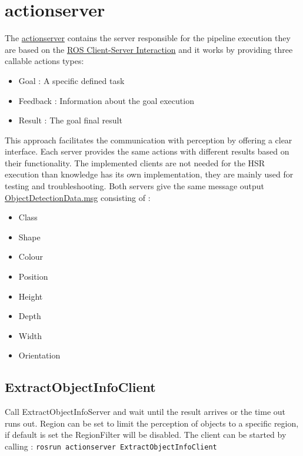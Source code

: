 \documentclass[main.tex]{subfiles}
\begin{document}
		\section{actionserver}
The \href{https://github.com/SUTURO/suturo_perception/tree/master/actionserver}{actionserver} contains the server responsible for the pipeline execution they are based on the \href{http://wiki.ros.org/actionlib}{ROS Client-Server Interaction} and it works by providing three callable actions types:
\begin{itemize}
	\item Goal : A specific defined task 
	\item Feedback : Information about the goal execution  
	\item Result : The goal final result 
\end{itemize}
This approach facilitates the communication with perception by offering a clear interface.
Each server provides the same actions with different results based on their functionality.
The implemented clients are not needed for the HSR execution than knowledge has its own implementation, they are mainly used for testing and troubleshooting. 
Both servers give the same message output \href{https://github.com/SUTURO/suturo_resources/blob/master/messages/suturo_perception_msgs/msg/ObjectDetectionData.msg}{ObjectDetectionData.msg} consisting of : 

	\begin{itemize}
	\item Class
	\item Shape
	\item Colour
	\item Position
	\item Height
	\item Depth
	\item Width
	\item Orientation
	\end{itemize}

			\subsection{ExtractObjectInfoClient}
Call ExtractObjectInfoServer and wait until the result arrives or the time out runs out. Region can be set to limit the perception of objects to a specific region, if default is set the RegionFilter will be disabled. The client can be started by calling : \texttt{rosrun actionserver ExtractObjectInfoClient}
\end{document}
